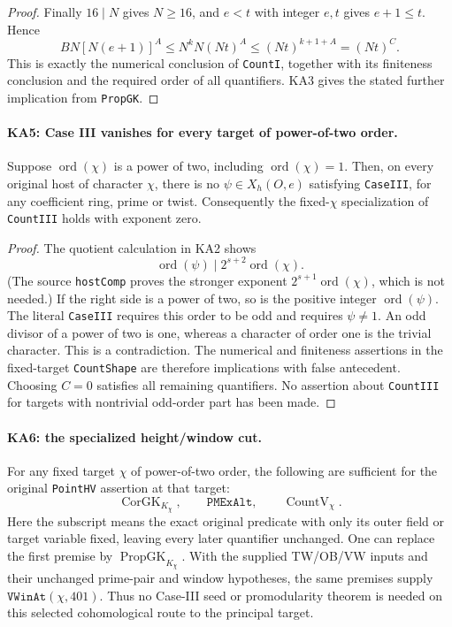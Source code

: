 \begin{proof}
Finally $16\mid N$ gives $N\ge16$, and $e<t$ with integer
$e,t$ gives $e+1\le t$.  Hence
\[
 BN[N(e+1)]^A
 \le N^kN(Nt)^A
 \le (Nt)^{k+1+A}=(Nt)^C.
 \tag{KA.15}
\]
This is exactly the numerical conclusion of \texttt{CountI},
together with its finiteness conclusion and the required order
of all quantifiers.  KA3 gives the stated further implication
from \texttt{PropGK}.
\end{proof}

\paragraph{KA5: Case III vanishes for every target of power-of-two order.}
\label{claim:KA5}
Suppose $\operatorname{ord}(\chi)$ is a power of two, including
$\operatorname{ord}(\chi)=1$.  Then, on every original host of
character $\chi$, there is no $\psi\in X_h(O,e)$ satisfying
\texttt{CaseIII}, for any coefficient ring, prime or twist.
Consequently the fixed-$\chi$ specialization of \texttt{CountIII}
holds with exponent zero.

\begin{proof}
The quotient calculation in KA2 shows
\[
  \operatorname{ord}(\psi)\mid2^{s+2}\operatorname{ord}(\chi).
 \tag{KA.16}
\]
(The source \texttt{hostComp} proves the stronger exponent
$2^{s+1}\operatorname{ord}(\chi)$, which is not needed.)
If the right side is a power of two, so is the positive integer
$\operatorname{ord}(\psi)$.  The literal \texttt{CaseIII}
requires this order to be odd and requires $\psi\ne1$.
An odd divisor of a power of two is one, whereas a character of
order one is the trivial character.  This is a contradiction.
The numerical and finiteness assertions in the fixed-target
\texttt{CountShape} are therefore implications with false
antecedent.  Choosing $C=0$ satisfies all remaining quantifiers.
No assertion about \texttt{CountIII} for targets with nontrivial
odd-order part has been made.
\end{proof}

\paragraph{KA6: the specialized height/window cut.}
\label{claim:KA6}
For any fixed target $\chi$ of power-of-two order, the following
are sufficient for the original \texttt{PointHV} assertion at
that target:
\[
 \operatorname{CorGK}_{K_\chi},\qquad
 \texttt{PMExAlt},\qquad \operatorname{CountV}_{\chi}.
 \tag{KA.17}
\]
Here the subscript means the exact original predicate with only
its outer field or target variable fixed, leaving every later
quantifier unchanged.  One can replace the first premise by
$\operatorname{PropGK}_{K_\chi}$.  With the supplied TW/OB/VW
inputs and their unchanged prime-pair and window hypotheses, the
same premises supply $\texttt{VWinAt}(\chi,401)$.  Thus no
Case-III seed or promodularity theorem is needed on this selected
cohomological route to the principal target.

